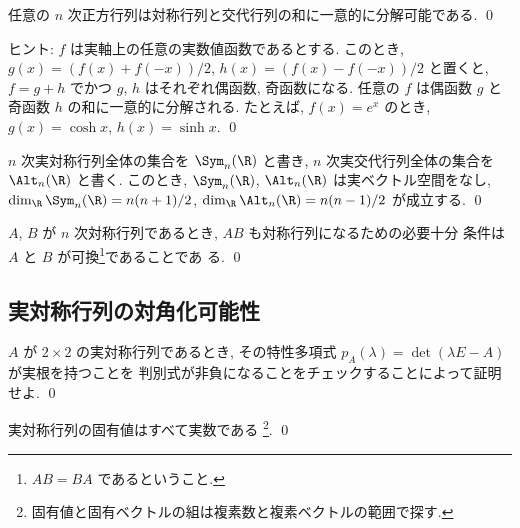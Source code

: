 \documentclass[12pt,twoside]{jarticle}
\begin{document}

\begin{question}
  任意の $n$ 次正方行列は対称行列と交代行列の和に一意的に分解可能である.
  \qed
\end{question}

\noindent
ヒント: $f$ は実軸上の任意の実数値函数であるとする. 
このとき, $g(x)=(f(x)+f(-x))/2$, $h(x)=(f(x)-f(-x))/2$ と置くと,
$f=g+h$ でかつ $g$, $h$ はそれぞれ偶函数, 奇函数になる.
任意の $f$ は偶函数 $g$ と奇函数 $h$ の和に一意的に分解される. 
たとえば, $f(x)=e^x$ のとき, $g(x)=\cosh x$, $h(x)=\sinh x$.
\qed


\begin{question}
  $n$ 次実対称行列全体の集合を $\Sym_n(\R)$ と書き,
  $n$ 次実交代行列全体の集合を $\Alt_n(\R)$ と書く.
  このとき, $\Sym_n(\R)$, $\Alt_n(\R)$ は実ベクトル空間をなし,
  $\dim_\R\Sym_n(\R)=n(n+1)/2$, $\dim_\R\Alt_n(\R)=n(n-1)/2$ が成立する. 
  \qed
\end{question}


\begin{question}
  $A$, $B$ が $n$ 次対称行列であるとき, $AB$ も対称行列になるための必要十分
  条件は $A$ と $B$ が可換\footnote{$AB=BA$ であるということ.}であることであ
  る.  \qed
\end{question}


\subsection{実対称行列の対角化可能性}

\begin{question}
  $A$ が $2\times 2$ の実対称行列であるとき,
  その特性多項式 $p_A(\lambda)=\det(\lambda E - A)$ が実根を持つことを
  判別式が非負になることをチェックすることによって証明せよ. \qed
\end{question}


\begin{question}
  実対称行列の固有値はすべて実数である%
  \footnote{固有値と固有ベクトルの組は複素数と複素ベクトルの範囲で探す.}. 
  \qed
\end{question}
\end{document}
